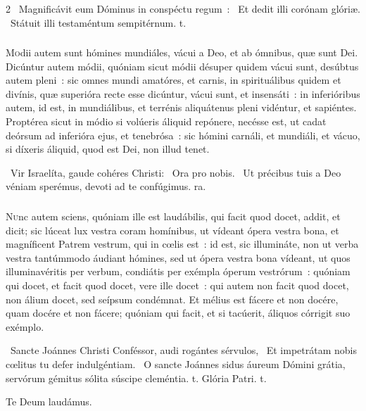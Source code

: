 \documentclass[9pt,twoside]{extarticle}
\begin{document}
\begin{multicols}{2}
~Magnificávit eum Dóminus in conspéctu regum~: \textred{*}~Et dedit illi corónam glóriæ. ~Státuit illi testaméntum sempitérnum. t.

\subsubsection*{\center \normalfont {}}
\lettrine{M}odii autem sunt hómines mundiáles, vácui a Deo, et ab ómnibus, quæ sunt Dei. Dicúntur autem módii, quóniam sicut módii désuper quidem vácui sunt, desúbtus autem pleni~: sic omnes mundi amatóres, et carnis, in spirituálibus quidem et divínis, quæ superióra recte esse dicúntur, vácui sunt, et insensáti~: in inferióribus autem, id est, in mundiálibus, et terrénis aliquátenus pleni vidéntur, et sapiéntes. Proptérea sicut in módio si volúeris áliquid repónere, necésse est, ut cadat deórsum ad inferióra ejus, et tenebrósa~: sic hómini carnáli, et mundiáli, et vácuo, si díxeris áliquid, quod est Dei, non illud tenet.

~Vir Israelíta, gaude cohéres Christi: \textred{*}~Ora pro nobis. ~Ut précibus tuis a Deo véniam sperémus, devoti ad te confúgimus. ra.

\subsubsection*{\center \normalfont {}}
\lettrine{N}unc autem sciens, quóniam ille est laudábilis, qui facit quod docet, addit, et dicit; sic lúceat lux vestra coram homínibus, ut vídeant ópera vestra bona, et magníficent Patrem vestrum, qui in cœlis est~: id est, sic illumináte, non ut verba vestra tantúmmodo áudiant hómines, sed ut ópera vestra bona vídeant, ut quos illuminavéritis per verbum, condiátis per exémpla óperum vestrórum~: quóniam qui docet, et facit quod docet, vere ille docet~: qui autem non facit quod docet, non álium docet, sed seípsum condémnat. Et mélius est fácere et non docére, quam docére et non fácere; quóniam qui facit, et si tacúerit, áliquos córrigit suo exémplo.

~Sancte Joánnes Christi Conféssor, audi rogántes sérvulos, \textred{*}~Et impetrátam nobis cœlitus tu defer indulgéntiam. ~O sancte Joánnes sidus áureum Dómini grátia, servórum gémitus sólita súscipe cleméntia. t. Glória Patri. t.
 
\smallskip
Te Deum laudámus. %


\end{multicols}
\end{document}

